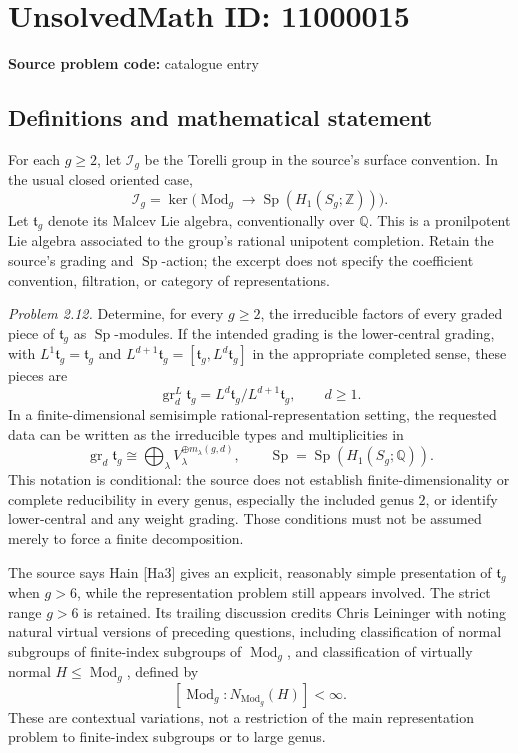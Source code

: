 \documentclass[11pt]{article}
\newcommand{\Z}{\mathbb{Z}}
\newcommand{\Q}{\mathbb{Q}}
\begin{document}
\section*{UnsolvedMath ID: 11000015}
\textbf{Source problem code:} catalogue entry
\subsection{Definitions and mathematical statement}
For each \(g\geq2\), let \(\mathcal I_g\) be the Torelli group in the source's surface convention. In the usual closed oriented case,
\[
 \mathcal I_g=\ker\bigl(\operatorname{Mod}_g\to
 \operatorname{Sp}(H_1(S_g;\Z))\bigr).
\]
Let \(\mathfrak t_g\) denote its Malcev Lie algebra, conventionally over \(\Q\). This is a pronilpotent Lie algebra associated to the group's rational unipotent completion. Retain the source's grading and \(\operatorname{Sp}\)-action; the excerpt does not specify the coefficient convention, filtration, or category of representations.

\emph{Problem 2.12.} Determine, for every \(g\geq2\), the irreducible factors of every graded piece of \(\mathfrak t_g\) as \(\operatorname{Sp}\)-modules. If the intended grading is the lower-central grading, with \(L^1\mathfrak t_g=\mathfrak t_g\) and \(L^{d+1}\mathfrak t_g=[\mathfrak t_g,L^d\mathfrak t_g]\) in the appropriate completed sense, these pieces are
\[
 \operatorname{gr}^L_d\mathfrak t_g
 =L^d\mathfrak t_g/L^{d+1}\mathfrak t_g,\qquad d\geq1.
\]
In a finite-dimensional semisimple rational-representation setting, the requested data can be written as the irreducible types and multiplicities in
\[
 \operatorname{gr}_d\mathfrak t_g\cong\bigoplus_\lambda
 V_\lambda^{\oplus m_\lambda(g,d)},
 \qquad\operatorname{Sp}=\operatorname{Sp}(H_1(S_g;\Q)).
\]
This notation is conditional: the source does not establish finite-dimensionality or complete reducibility in every genus, especially the included genus \(2\), or identify lower-central and any weight grading. Those conditions must not be assumed merely to force a finite decomposition.

The source says Hain [Ha3] gives an explicit, reasonably simple presentation of \(\mathfrak t_g\) when \(g>6\), while the representation problem still appears involved. The strict range \(g>6\) is retained. Its trailing discussion credits Chris Leininger with noting natural virtual versions of preceding questions, including classification of normal subgroups of finite-index subgroups of \(\operatorname{Mod}_g\), and classification of virtually normal \(H\leq\operatorname{Mod}_g\), defined by
\[
 [\operatorname{Mod}_g:N_{\operatorname{Mod}_g}(H)]<\infty.
\]
These are contextual variations, not a restriction of the main representation problem to finite-index subgroups or to large genus.
\end{document}
